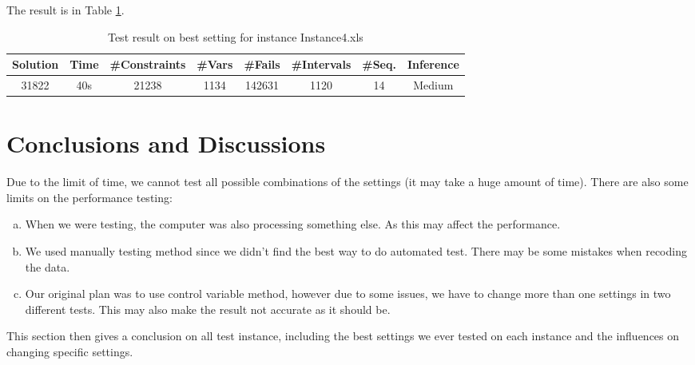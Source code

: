 \documentclass[a4paper, 12pt]{article}
\begin{document}
The result is in Table \ref{best4}. 

\begin{table}
    \centering
    \caption{Test result on best setting for instance Instance4.xls}
    \label{best4}
    \begin{tabular}{|c|c|c|c|c|c|c|c|}
        \hline
        Solution & Time & \#Constraints & \#Vars & \#Fails & \#Intervals & \#Seq. & Inference \\
        \hline
        31822 & 40s & 21238 & 1134 & 142631 & 1120 & 14 & Medium \\
        \hline
    \end{tabular}
\end{table}

\section{Conclusions and Discussions}

Due to the limit of time, we cannot test all possible combinations of the settings (it may take a huge amount of time). There are also some limits on the performance testing: 
\begin{enumerate}[a.~]
\item When we were testing, the computer was also processing something else. As this may affect the performance. 
\item We used manually testing method since we didn't find the best way to do automated test. There may be some mistakes when recoding the data. 
\item Our original plan was to use control variable method, however due to some issues, we have to change more than one settings in two different tests. This may also make the result not accurate as it should be. 
\end{enumerate}

This section then gives a conclusion on all test instance, including the best settings we ever tested on each instance and the influences on changing specific settings. 
\end{document}
